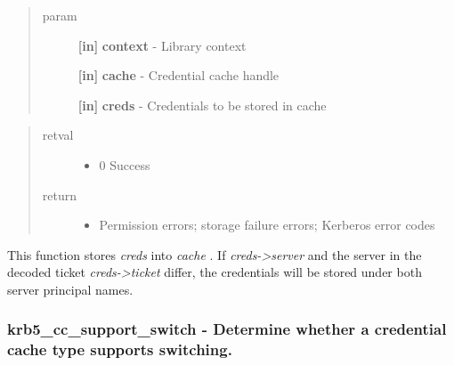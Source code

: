 \documentclass[letterpaper,10pt,english]{sphinxmanual}
\begin{document}
\begin{quote}\begin{description}
\item[{param}] \leavevmode
\textbf{{[}in{]}} \textbf{context} - Library context

\textbf{{[}in{]}} \textbf{cache} - Credential cache handle

\textbf{{[}in{]}} \textbf{creds} - Credentials to be stored in cache

\end{description}\end{quote}
\begin{quote}\begin{description}
\item[{retval}] \leavevmode\begin{itemize}
\item {} 
0   Success

\end{itemize}

\item[{return}] \leavevmode\begin{itemize}
\item {} 
Permission errors; storage failure errors; Kerberos error codes

\end{itemize}

\end{description}\end{quote}

This function stores \emph{creds} into \emph{cache} . If \emph{creds-\textgreater{}server} and the server in the decoded ticket \emph{creds-\textgreater{}ticket} differ, the credentials will be stored under both server principal names.


\subsubsection{krb5\_cc\_support\_switch -  Determine whether a credential cache type supports switching.}
\label{appdev/refs/api/krb5_cc_support_switch::doc}\label{appdev/refs/api/krb5_cc_support_switch:krb5-cc-support-switch-determine-whether-a-credential-cache-type-supports-switching}

\begin{fulllineitems}
\label{appdev/refs/api/krb5_cc_support_switch:krb5_cc_support_switch}
\end{fulllineitems}
\end{document}
